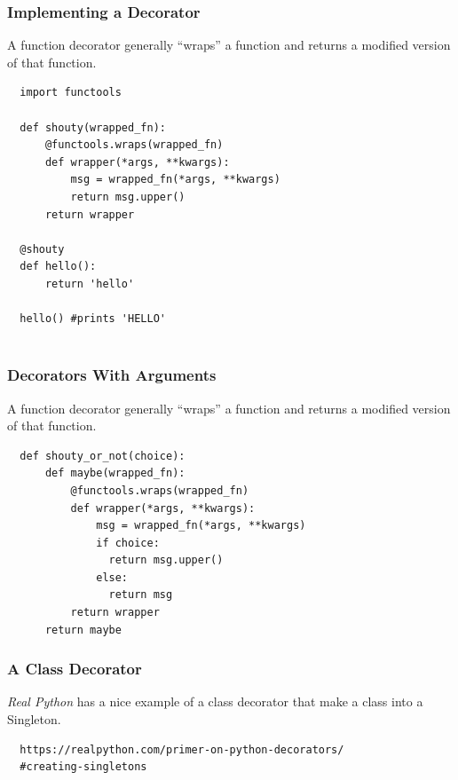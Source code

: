 \documentclass[10pt]{beamer}
\begin{document}
\begin{frame}[fragile]
  \frametitle{Implementing a Decorator}
  A function decorator generally ``wraps'' a function and returns a modified version of that function.  
  \vspace{5mm}
  \begin{verbatim}
  import functools
  
  def shouty(wrapped_fn):
      @functools.wraps(wrapped_fn)
      def wrapper(*args, **kwargs):
          msg = wrapped_fn(*args, **kwargs)
          return msg.upper()
      return wrapper
      
  @shouty
  def hello():
      return 'hello' 
      
  hello() #prints 'HELLO'           
  
  \end{verbatim}
  
\end{frame} 

\begin{frame}[fragile]
  \frametitle{Decorators With Arguments}
  A function decorator generally ``wraps'' a function and returns a modified version of that function.  
  \vspace{5mm}
  \begin{verbatim}
  def shouty_or_not(choice):
      def maybe(wrapped_fn):
          @functools.wraps(wrapped_fn)
          def wrapper(*args, **kwargs):
              msg = wrapped_fn(*args, **kwargs)
              if choice:
                return msg.upper()
              else:
                return msg  
          return wrapper
      return maybe
   \end{verbatim}
  
\end{frame} 

\begin{frame}[fragile]
  \frametitle{A Class Decorator}
  
  \emph{Real Python} has a nice example of a class decorator that make a class into 
  a Singleton.
  
  \vspace{5mm}
  \begin{verbatim}
  https://realpython.com/primer-on-python-decorators/
  #creating-singletons
  \end{verbatim}
\end{frame}
\end{document}
